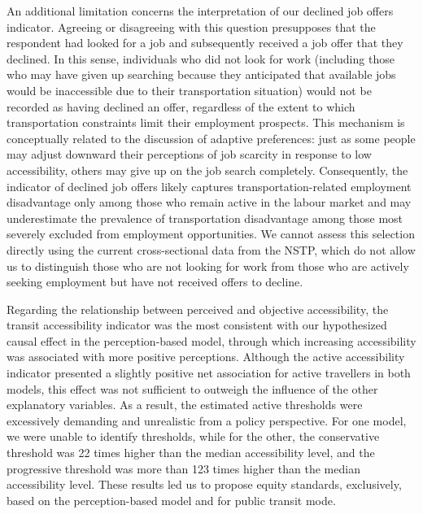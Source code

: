 \documentclass[preprint, 3p,
authoryear]{elsarticle} %
\begin{document}
An additional limitation concerns the interpretation of our declined job
offers indicator. Agreeing or disagreeing with this question presupposes
that the respondent had looked for a job and subsequently received a job
offer that they declined. In this sense, individuals who did not look
for work (including those who may have given up searching because they
anticipated that available jobs would be inaccessible due to their
transportation situation) would not be recorded as having declined an
offer, regardless of the extent to which transportation constraints
limit their employment prospects. This mechanism is conceptually related
to the discussion of adaptive preferences: just as some people may
adjust downward their perceptions of job scarcity in response to low
accessibility, others may give up on the job search completely.
Consequently, the indicator of declined job offers likely captures
transportation-related employment disadvantage only among those who
remain active in the labour market and may underestimate the prevalence
of transportation disadvantage among those most severely excluded from
employment opportunities. We cannot assess this selection directly using
the current cross-sectional data from the NSTP, which do not allow us to
distinguish those who are not looking for work from those who are
actively seeking employment but have not received offers to decline.

Regarding the relationship between perceived and objective
accessibility, the transit accessibility indicator was the most
consistent with our hypothesized causal effect in the perception-based
model, through which increasing accessibility was associated with more
positive perceptions. Although the active accessibility indicator
presented a slightly positive net association for active travellers in
both models, this effect was not sufficient to outweigh the influence of
the other explanatory variables. As a result, the estimated active
thresholds were excessively demanding and unrealistic from a policy
perspective. For one model, we were unable to identify thresholds, while
for the other, the conservative threshold was 22 times higher than the
median accessibility level, and the progressive threshold was more than
123 times higher than the median accessibility level. These results led
us to propose equity standards, exclusively, based on the
perception-based model and for public transit mode.
\end{document}
